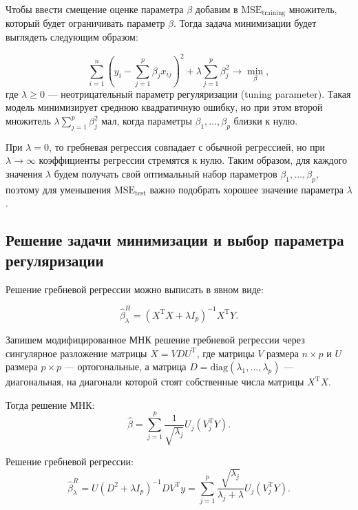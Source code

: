 \documentclass[specialist,
               subf,href,colorlinks=true, 12pt,a4paper]{article} %
\newcommand{\T}{\mathrm{T}}
\numberwithin{equation}{section}
\begin{document}
Чтобы ввести смещение оценке параметра $\beta$ добавим в $\mathrm{MSE}_{\mathrm{training}}$ множитель, который будет ограничивать параметр $\beta$. Тогда задача минимизации будет выглядеть следующим образом:

\begin{equation*}
\sum_{i=1}^n(y_i - \sum_{j=1}^p \beta_j x_{ij})^2  + \lambda \sum_{j = 1}^p \beta_j^2 \rightarrow \min_{\beta},
\end{equation*}
где $\lambda \geq 0$ --- неотрицательный параметр регуляризации (tuning parameter). Такая модель минимизирует среднюю квадратичную ошибку, но при этом второй множитель $\lambda\sum_{j = 1}^p \beta_j^2$ мал, когда параметры $\beta_1, \ldots, \beta_p$ близки к нулю. 

При $\lambda = 0$, то гребневая регрессия совпадает с обычной регрессией, но при $\lambda \rightarrow \infty$ коэффициенты регрессии стремятся к нулю. Таким образом, для каждого значения $\lambda$ будем получать свой оптимальный набор параметров $\beta_1, \ldots, \beta_p$, поэтому для уменьшения $\mathrm{MSE}_{\mathrm{test}}$ важно подобрать хорошее значение параметра $\lambda$. 

\subsection{Решение задачи минимизации и выбор параметра регуляризации}


Решение гребневой регрессии можно выписать в явном виде:

\begin{equation}\label{greb_regr_min_fun}
\hat{\beta}_{\lambda}^{R} = (X^{\mathrm{T}}X+ \lambda I_p)^{-1} X^{\mathrm{T}}Y.
\end{equation}

Запишем модифицированное МНК решение гребневой регрессии через сингулярное разложение матрицы $X = VDU^{\T}$, где матрицы $V$ размера $n \times p$ и $U$ размера $p \times p$ --- ортогональные, а матрица $D = \mathrm{diag}(\lambda_1, \ldots, \lambda_p)$ --- диагональная, на диагонали которой стоят собственные числа матрицы $X^{\T}X$.

Тогда решение МНК:
\begin{equation*}
\hat{\beta} = \sum_{j=1}^p \frac{1}{\sqrt{\lambda_j}} U_j(V_j^{\T}Y).
\end{equation*}

Решение гребневой регрессии:
\begin{equation}\label{greb_regr_solution}
\hat{\beta}_{\lambda}^{R} = U(D^2 + \lambda I_p)^{-1}DV^{\T}y = \sum_{j=1}^p \frac{\sqrt{\lambda_j}}{\lambda_j + \lambda} U_j(V_j^{\T}Y).
\end{equation}
\end{document}
